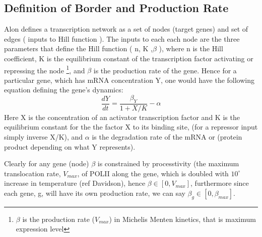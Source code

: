 \subsection{Definition of Border and Production Rate}

Alon defines a transcription network as a set of nodes (target genes) and set of edges ( inputs to Hill function ).  The inputs to each each node are the three parameters that define the Hill function ( n, K ,$\beta$ ), where n is the Hill coefficient, K is the equilibrium constant of the transcription factor activating or repressing the node \footnote[1]{ $\beta$ is the production rate ($V_{max}$) in Michelis Menten kinetics, that is maximum expression level}, and $\beta$ is the production rate of the gene.  Hence for a particular gene, which has mRNA concentration Y, one would have the following equation defining the gene's dynamics:
  \begin{equation}\label{}
    \frac{d Y}{d t} = \frac{\beta_{Y} }{ 1 + X/K} - \alpha
  \end{equation}
  Here X is the concentration of an activator transcription factor and K is the equilibrium constant for the the factor X to its binding site, (for a repressor input simply inverse X/K), and $\alpha$ is the degradation rate of the mRNA or (protein product depending on what Y represents).

  Clearly for any gene (node) $\beta$ is constrained by processtivity (the maximum translocation rate, $V_{max}$, of POLII along the gene, which is doubled with $10^{\circ}$ increase in temperature (ref Davidson), hence $\beta \in [0,V_{max}]$, furthermore since each gene, g,  will have its own production rate, we can say $\beta_g \in [0,\beta_{max}]$.

